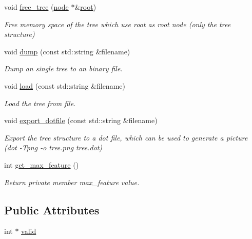 \begin{DoxyCompactItemize}
void \hyperlink{classtree_ae92bd57b719a2575d9fec46f514cbbe9}{free\+\_\+tree} (\hyperlink{classnode}{node} $\ast$\&\hyperlink{classtree_ad397d4906e47149b98f769b3e81473ee}{root})
\begin{DoxyCompactList}\small\item\em Free memory space of the tree which use {\ttfamily root} as root node (only the tree structure) \end{DoxyCompactList}\item 
void \hyperlink{classtree_a634ee04f1f89801a9f295e11cc5ce149}{dump} (const std\+::string \&filename)
\begin{DoxyCompactList}\small\item\em Dump an single tree to an binary file. \end{DoxyCompactList}\item 
void \hyperlink{classtree_a680d0cc993c3a3d3ef10c891de69960f}{load} (const std\+::string \&filename)
\begin{DoxyCompactList}\small\item\em Load the tree from file. \end{DoxyCompactList}\item 
void \hyperlink{classtree_abc6048c70de7490eabf2433d46067b7b}{export\+\_\+dotfile} (const std\+::string \&filename)
\begin{DoxyCompactList}\small\item\em Export the tree structure to a dot file, which can be used to generate a picture (dot -\/\+Tpng -\/o tree.\+png tree.\+dot) \end{DoxyCompactList}\item 
int \hyperlink{classtree_a8042d0897915fdfeeca4b4d75515b96c}{get\+\_\+max\+\_\+feature} ()
\begin{DoxyCompactList}\small\item\em Return private member {\ttfamily max\+\_\+feature} value. \end{DoxyCompactList}\end{DoxyCompactItemize}
\subsection*{Public Attributes}
\begin{DoxyCompactItemize}
\item 
int $\ast$ \hyperlink{classtree_afa8e539406e1f8b373b147682e3a8196}{valid}
\end{DoxyCompactItemize}
